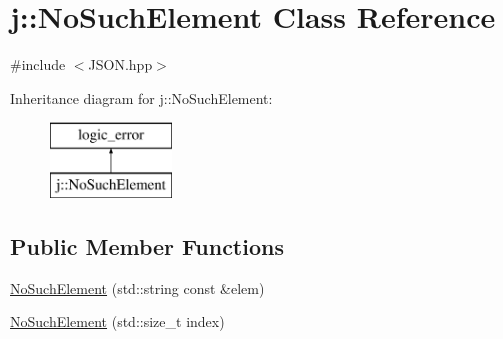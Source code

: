 \hypertarget{classj_1_1_no_such_element}{\section{j\-:\-:No\-Such\-Element Class Reference}
\label{classj_1_1_no_such_element}
}


{\ttfamily \#include $<$J\-S\-O\-N.\-hpp$>$}

Inheritance diagram for j\-:\-:No\-Such\-Element\-:\begin{figure}[H]
\begin{center}
\leavevmode
\includegraphics[height=2.000000cm]{classj_1_1_no_such_element}
\end{center}
\end{figure}
\subsection*{Public Member Functions}
\begin{DoxyCompactItemize}
\item 
\hyperlink{classj_1_1_no_such_element_a72a83b05d48e7d7805dc4cefaad325e3}{No\-Such\-Element} (std\-::string const \&elem)
\item 
\hyperlink{classj_1_1_no_such_element_a99542935049a656120e428d5611c28d8}{No\-Such\-Element} (std\-::size\-\_\-t index)
\end{DoxyCompactItemize}


